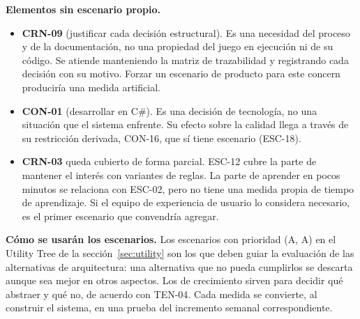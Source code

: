 \textbf{Elementos sin escenario propio.}

\begin{itemize}
  \item \textbf{CRN-09} (justificar cada decisión estructural). Es una necesidad del proceso y de la documentación, no una propiedad del juego en ejecución ni de su código. Se atiende manteniendo la matriz de trazabilidad y registrando cada decisión con su motivo. Forzar un escenario de producto para este concern produciría una medida artificial.
  \item \textbf{CON-01} (desarrollar en C\#). Es una decisión de tecnología, no una situación que el sistema enfrente. Su efecto sobre la calidad llega a través de su restricción derivada, CON-16, que sí tiene escenario (ESC-18).
  \item \textbf{CRN-03} queda cubierto de forma parcial. ESC-12 cubre la parte de mantener el interés con variantes de reglas. La parte de aprender en pocos minutos se relaciona con ESC-02, pero no tiene una medida propia de tiempo de aprendizaje. Si el equipo de experiencia de usuario lo considera necesario, es el primer escenario que convendría agregar.
\end{itemize}

\textbf{Cómo se usarán los escenarios.} Los escenarios con prioridad (A, A) en el Utility Tree de la sección~\ref{sec:utility} son los que deben guiar la evaluación de las alternativas de arquitectura: una alternativa que no pueda cumplirlos se descarta aunque sea mejor en otros aspectos. Los de crecimiento sirven para decidir qué abstraer y qué no, de acuerdo con TEN-04. Cada medida se convierte, al construir el sistema, en una prueba del incremento semanal correspondiente.
